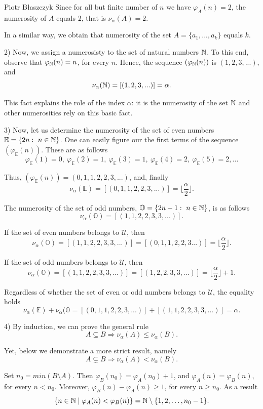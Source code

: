 \begin{artengenv}{Piotr Błaszczyk}
Since for all but finite number of $n$ we have $\varphi_A(n)=2$, the numerosity of $A$ equals 2, that is $\nu_\alpha (A)=2$.

In a similar way, we  obtain that numerosity of the set $A=\{a_1,...,a_k\}$ equals $k$.

2) Now, we  assign a numerosisty to the set of natural numbers ${\mathbb{N}}$. To this end, 
  observe that  $\varphi_{{\mathbb{N}}}(n)=n$, for every $n$. Hence, the sequence  $(\varphi_{{\mathbb{N}}} (n))$ is $(1,2,3,...)$, and
\[\nu_\alpha ({\mathbb{N}})=[(1,2,3,...)]=\alpha.\]

This fact explains the role of the index $\alpha$: it is the numerosity of the set ${\mathbb{N}}$ and other numerosities rely on this basic fact.


3) Now, let us determine the numerosity of the set of even numbers $\mathbb E=\{2n:\ n\in{\mathbb{N}}\}$. One can easily  figure our the first terms of the sequence $(\varphi_{\mathbb E}(n))$. These are as follows
\[\varphi_{\mathbb E}(1)=0,\ \varphi_{\mathbb E}(2)=1,\ \varphi_{\mathbb E}(3)=1,\ \varphi_{\mathbb E}(4)=2,\ \varphi_{\mathbb E}(5)=2,...\]

Thus, $(\varphi_{\mathbb E}(n))=(0,1,1,2,2,3,...)$, and, finally
\[\nu_\alpha (\mathbb E)=[(0,1,1,2,2,3,...)]=  \Big\lfloor \frac\alpha 2 \Big\rfloor.   \]

The numerosity of the set of odd numbers, $\mathbb O=\{2n-1:\ n\in{\mathbb{N}}\}$, is as follows
\[\nu_{\alpha}(\mathbb O)=[(1,1,2,2,3,3,...)].\]

If the set of even numbers belongs to $\mathcal U$, then
\[\nu_{\alpha}(\mathbb O)=[(1,1,2,2,3,3,...)]=[(0,1,1,2,2,3...)]=\Big\lfloor \frac\alpha 2 \Big\rfloor.\]

If the set of odd numbers belongs to $\mathcal U$, then
\[\nu_{\alpha}(\mathbb O)=[(1,1,2,2,3,3,...)]=[(1,2,2,3,3,...)]=\Big\lfloor \frac\alpha 2 \Big\rfloor+1.\]

Regardless of whether the set of even or odd numbers belongs to $\mathcal U$, the equality holds
\[ \nu_\alpha (\mathbb E)+ \nu_{\alpha}(\mathbb O = [(0,1,1,2,2,3,...)]+ [(1,1,2,2,3,3,...)]=\alpha. \]

4) By induction, we can prove the general rule
\[A\subseteq B\Rightarrow \nu_\alpha (A)\leq\nu_\alpha (B).\]

Yet, below we demonstrate a more strict result, namely
\begin{equation}A\varsubsetneq B\Rightarrow \nu_\alpha (A)<\nu_\alpha (B).\end{equation}


Set $n_0=min(B\setminus A)$. Then $\varphi_B(n_0)=\varphi_A(n_0)+1$, and $\varphi_A(n)=\varphi_B(n)$, for every $n<n_0$. Moreover, $\varphi_B(n)-\varphi_A(n)\geq 1$, for every $n\geq n_0$. As a result
\[\{ n\in{\mathbb{N}}\mid\varphi_A(n)<\varphi_B(n)\}={\mathbb{N}}\setminus\{ 1, 2, \ldots, n_0-1\}.\] 


\end{artengenv}
